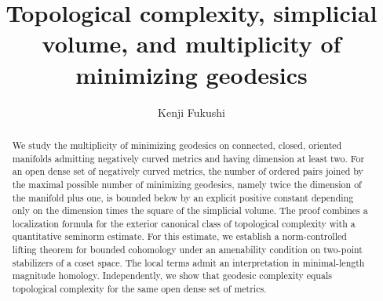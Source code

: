 \documentclass{amsart}
\title[Topological complexity and minimizing geodesics]{
  Topological complexity, simplicial volume,
  and multiplicity of minimizing geodesics
}
\author{Kenji Fukushi}
\date{}
\numberwithin{equation}{section}
\begin{document}
\begin{abstract}
We study the multiplicity of minimizing geodesics on connected,
closed, oriented manifolds admitting negatively curved metrics
and having dimension at least two. For an open dense set of
negatively curved metrics, the number of ordered pairs joined
by the maximal possible number of minimizing geodesics, namely
twice the dimension of the manifold plus one, is bounded below
by an explicit positive constant depending only on the dimension
times the square of the simplicial volume.
The proof combines a localization formula for the exterior
canonical class of topological complexity with a quantitative
seminorm estimate. For this estimate, we establish a norm-controlled
lifting theorem for bounded cohomology under an amenability
condition on two-point stabilizers of a coset space.
The local terms admit an interpretation in minimal-length magnitude
homology. Independently, we show that geodesic complexity equals
topological complexity for the same open dense set of metrics.
\end{abstract}

\maketitle



















\end{document}
